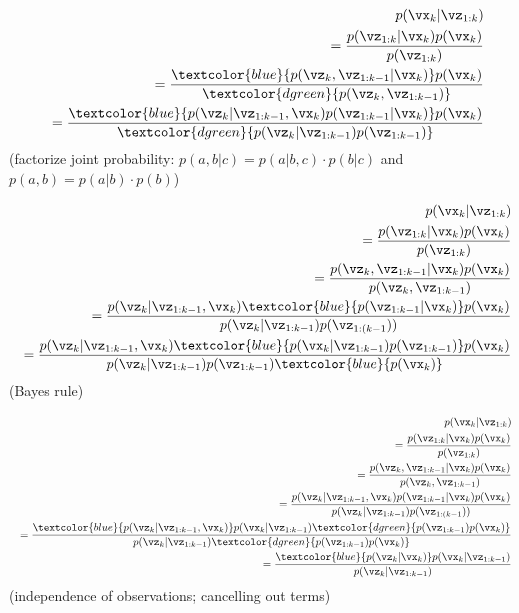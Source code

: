 \documentclass[english,pdftex]{article}
\begin{document}
\newpage
\temp
\begin{eqnarray*}
    && \hspace*{75mm} \\[-5mm]
    && p(\vx_k|\vz_{1:k}) \\
    &&= \frac{p(\vz_{1:k}|\vx_k)p(\vx_k)}{p(\vz_{1:k})} \\
    &&= \frac{\textcolor{blue}{p(\vz_{k},\vz_{1:k-1}|\vx_k)}p(\vx_k)}{\textcolor{dgreen}{p(\vz_{k},\vz_{1:k-1})}} \\
    &&= \frac{\textcolor{blue}{p(\vz_{k}|\vz_{1:k-1},\vx_k)p(\vz_{1:k-1}|\vx_k)}
        p(\vx_k)}{\textcolor{dgreen}{p(\vz_{k}|\vz_{1:k-1})p(\vz_{1:k-1})}}
\end{eqnarray*}
(factorize joint probability: $p(a,b|c) = p(a|b,c)\cdot p(b|c)$
and $p(a,b) = p(a|b)\cdot p(b)$)


\newpage
\temp
\begin{eqnarray*}
    && \hspace*{75mm} \\[-5mm]
    && p(\vx_k|\vz_{1:k}) \\
    &&= \frac{p(\vz_{1:k}|\vx_k)p(\vx_k)}{p(\vz_{1:k})} \\
    &&= \frac{p(\vz_{k},\vz_{1:k-1}|\vx_k)p(\vx_k)}{p(\vz_{k},\vz_{1:k-1})} \\
    &&= \frac{p(\vz_{k}|\vz_{1:k-1},\vx_k)\textcolor{blue}{p(\vz_{1:k-1}|\vx_k)}
        p(\vx_k)}{p(\vz_{k}|\vz_{1:k-1})p(\vz_{1:(k-1}))} \\
    &&= \frac{p(\vz_{k}|\vz_{1:k-1},\vx_k)\textcolor{blue}{p(\vx_k|\vz_{1:k-1})p(\vz_{1:k-1})}
        p(\vx_k)}{p(\vz_{k}|\vz_{1:k-1})p(\vz_{1:k-1})\textcolor{blue}{p(\vx_k)}}
\end{eqnarray*}
(Bayes rule)


\newpage
\temp
\begin{eqnarray*}
    && \hspace*{75mm} \\[-5mm]
    && p(\vx_k|\vz_{1:k}) \\
    &&= \frac{p(\vz_{1:k}|\vx_k)p(\vx_k)}{p(\vz_{1:k})} \\
    &&= \frac{p(\vz_{k},\vz_{1:k-1}|\vx_k)p(\vx_k)}{p(\vz_{k},\vz_{1:k-1})} \\
    &&= \frac{p(\vz_{k}|\vz_{1:k-1},\vx_k)p(\vz_{1:k-1}|\vx_k)
        p(\vx_k)}{p(\vz_{k}|\vz_{1:k-1})p(\vz_{1:(k-1}))} \\
    &&= \frac{\textcolor{blue}{p(\vz_{k}|\vz_{1:k-1},\vx_k)}p(\vx_k|\vz_{1:k-1})\textcolor{dgreen}{p(\vz_{1:k-1})
        p(\vx_k)}}{p(\vz_{k}|\vz_{1:k-1})\textcolor{dgreen}{p(\vz_{1:k-1})p(\vx_k)}} \\
    &&= \frac{\textcolor{blue}{p(\vz_k|\vx_k)}p(\vx_k|\vz_{1:k-1})}{p(\vz_{k}|\vz_{1:k-1})}
\end{eqnarray*}
(independence of observations; cancelling out terms)
\end{document}
